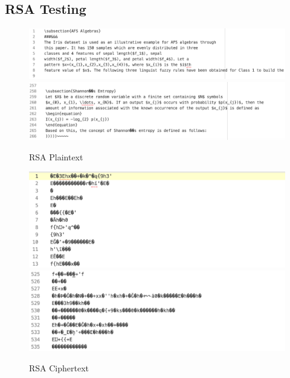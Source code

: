 \documentclass[]{article}
\begin{document}
\pagebreak

\vspace*{-0.8cm}

\subsection*{RSA Testing}

\begin{figure}[H]
	\includegraphics[height=\textheight/6,width=\textwidth]{rsa_plain1.png}
	\includegraphics[height=\textheight/6,width=\textwidth]{rsa_plain2.png}	
	\caption{RSA Plaintext}
	\centering
\end{figure}

\begin{figure}[H]
	\includegraphics[width=\textwidth]{rsa_cipher1.png}
	\includegraphics[width=\textwidth]{rsa_cipher2.png}	
	\caption{RSA Ciphertext}
	\centering
\end{figure}
\end{document}
